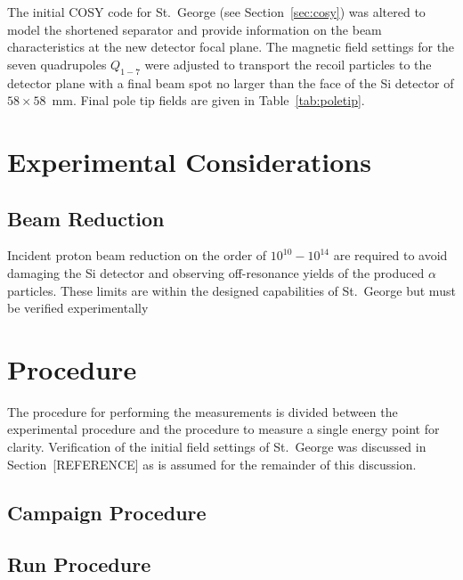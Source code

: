 The initial COSY code for St.\ George (see Section~\ref{sec:cosy}) was altered
to model the shortened separator and provide information on the beam
characteristics at the new detector focal plane. The magnetic field settings
for the seven quadrupoles $Q_{1-7}$ were adjusted to transport the recoil
particles to the detector plane with a final beam spot no larger than the face
of the Si detector of $58\times 58$~mm. Final pole tip fields are given in
Table~\ref{tab:poletip}.




\section{Experimental Considerations}

\subsection{Beam Reduction}
Incident proton beam reduction on the order of $10^{10} - 10^{14}$ are required
to avoid damaging the Si detector and observing off-resonance yields of the
produced $\alpha$ particles. These limits are within the designed capabilities
of St.\ George but must be verified experimentally




\section{Procedure}

The procedure for performing the \alpa{} measurements is divided between the
experimental procedure and the procedure to measure a single energy point for
clarity. Verification of the initial field settings of St.\ George was
discussed in Section~[REFERENCE] as is assumed for the remainder of this
discussion.

\subsection{Campaign Procedure}



\subsection{Run Procedure}

